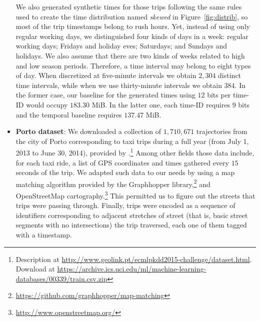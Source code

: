 \begin{itemize}
	 
	We also generated synthetic times for those trips following the same rules used to create the time distribution
	named \textit{skewed} in Figure~\ref{fig:distrib}, so most of the trip timestamps belong to rush hours. 
	Yet, instead of using only regular working days, we distinguished four kinds of days in a week: 
	regular working days; Fridays and holiday eves; Saturdays; and Sundays and holidays. We also 
	assume that there are two kinds of weeks related to high and low season periods. 
	Therefore, a time interval may belong to eight types of day. 
	When discretized at five-minute intervals we obtain $2,\!304$ distinct time intervals, 
	while when we use thirty-minute intervals we obtain $384$. In the former case, our  baseline
	 for the generated times using  $12$ bits per time-ID would occupy $183.30$ MiB. In the latter one, each
	time-ID requires  $9$ bits and the  temporal baseline requires $137.47$ MiB.


	   \item \textbf{Porto dataset}:
		We downloaded a collection of $1,\!710,\!671 $ trajectories from the city of {Porto} corresponding to taxi trips during 
		a full year (from July 1, 2013 to June 30, 2014), provided by \cite{moreira2013predicting}.\footnote{Description at \url{http://www.geolink.pt/ecmlpkdd2015-challenge/dataset.html}. Download at \url{https://archive.ics.uci.edu/ml/machine-learning-databases/00339/train.csv.zip}} Among other
		fields those data include, for each taxi ride, a list of GPS coordinates and times gathered every $15$ seconds of
		the trip. We adapted such data to our needs by using a map matching algorithm provided by the Graphhopper library,\footnote{\url{https://github.com/graphhopper/map-matching}}
		 and OpenStreetMap cartography.\footnote{\url{http://www.openstreetmap.org/}} This permitted us to
	  figure out the streets that trips were passing through. Finally, trips were encoded as a sequence of identifiers
	  corresponding to adjacent stretches of street (that is, basic street segments with no intersections) the trip traversed, 
	  each one of them tagged with a timestamp.

	  

\end{itemize}
